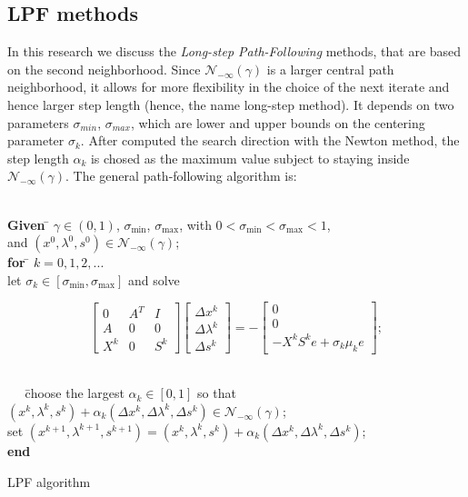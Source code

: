 \documentclass[a4paper,10 pt,titlepage,twoside]{book}
\theoremstyle{plain}
\theoremstyle{definition}
\theoremstyle{remark}
\begin{document}
\subsection*{LPF methods}
In this research we discuss the \textit{Long-step Path-Following} methods, that are based on the second neighborhood. Since  $\mathcal{N}_{-\infty}(\gamma)$ is a larger central path neighborhood, it allows for more flexibility in the choice of the next iterate and hence larger step length (hence, the name long-step method). It depends on two parameters $\sigma_{min}$, $\sigma_{max}$, which are lower and upper bounds on the centering parameter $\sigma_{k}$. After computed the search direction with the Newton method, the step length $\alpha_{k}$ is chosed as the maximum value subject to staying inside $\mathcal{N}_{-\infty}(\gamma)$.
The general path-following algorithm is:
\begin{algorithm}[H]
	\begin{tabbing}
		\\
		\textbf{Given  }\= $\gamma\in(0,1)$, $\sigma_{\text{min}}$, $\sigma_{\text{max}}$, with $0<\sigma_{\text{min}}< \sigma_{\text{max}}<1$,\\
		\> and $(x^{0}, \lambda^{0}, s^{0})\in\mathcal{N}_{-\infty}(\gamma)$;\\
		\textbf{for} \= $k = 0, 1, 2,...$ \\
		\> let $\sigma_{k}\in[\sigma_{\text{min}},\sigma_{\text{max}}]$ and solve
	\end{tabbing}
	\begin{equation}\label{Pb}
	\begin{bmatrix}
	0&A^{T}&I \\A&0&0\\X^{k}&0&S^{k}
	\end{bmatrix}\begin{bmatrix}
	\Delta x^{k}\\\Delta\lambda^{k} \\\Delta s^{k}
	\end{bmatrix}=-\begin{bmatrix}
	0\\0\\-X^{k}S^{k}e + \sigma_{k}\mu_{k}e
	\end{bmatrix};
	\end{equation}
	\begin{tabbing}
		\\
		$\;\;\;\;\;$\=choose the largest $\alpha_{k}\in[0,1]$ so that $(x^{k}, \lambda^{k}, s^{k})+ \alpha_{k}(\Delta x^{k}, \Delta\lambda^{k}, \Delta s^{k})\in\mathcal{N}_{-\infty}(\gamma)$; \\
		\>set $(x^{k+1}, \lambda^{k+1}, s^{k+1}) = (x^{k}, \lambda^{k}, s^{k})+ \alpha_{k}(\Delta x^{k}, \Delta\lambda^{k}, \Delta s^{k})$;\\
		
		\textbf{end}
	\end{tabbing}
	\caption{LPF algorithm}
\end{algorithm}
\end{document}
